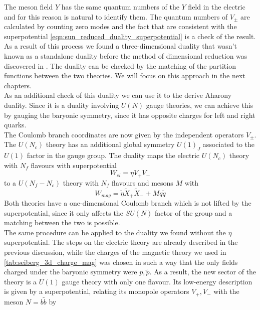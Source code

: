 The meson field $Y$ has the same quantum numbers of the $Y$ field in the electric and for this reason is natural to identify them.
The quantum numbers of $V_{\pm}$ are calculated by counting zero modes and the fact that are consistent with the superpotential \eqref{eqn:sun_reduced_duality_superpotential} is a check of the result.\\
As a result of this process we found a three-dimensional duality that wasn't known as a standalone duality before the method of dimensional reduction was discovered in \cite{Aharony:2013dha}.
The duality can be checked by the matching of the partition functions between the two theories. 
We will focus on this approach in the next chapters. \\
As an additional check of this duality we can use it to the derive Aharony duality. 
Since it is a duality involving $U(N)$ gauge theories, we can achieve this by gauging the baryonic symmetry, since it has opposite charges for left and right quarks. \\
The Coulomb branch coordinates are now given by the independent operators $V_{\pm}$.
The $U(N_c)$ theory has an additional global symmetry $U(1)_J$ associated to the $U(1)$ factor in the gauge group. 
The duality maps the electric $U(N_c)$ theory with $N_f$ flavours with superpotential
\begin{equation}
W_{el} = \eta V_+ V_-
\end{equation}
to a $U(N_f - N_c)$ theory with $N_f $ flavours and mesons $M$ with
\begin{equation}
W_{mag} = \tilde{\eta} \tilde{X}_+ \tilde{X}_- + M q \tilde{q}
\end{equation}
Both theories have a one-dimensional Coulomb branch which is not lifted by the superpotential, since it only affects the $SU(N)$ factor of the group and a matching between the two is possible.\\
The same procedure can be applied to the duality we found without the $\eta$ superpotential.
The steps on the electric theory are already described in the previous discussion, while the charges of the magnetic theory we used in \eqref{tab:seiberg_3d_charge_mag} was chosen in such a way that the only fields charged under the baryonic symmetry were $p,\tilde{p}$.
As a result, the new sector of the theory is a $U(1)$ gauge theory with only one flavour.
Its low-energy description is given by a superpotential, relating its monopole operators $V_+,V_-$ with the meson $N=b \tilde{b}$ by
